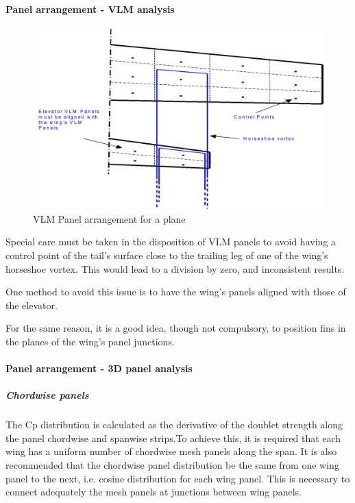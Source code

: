 \documentclass[a4paper,twoside,12pt,dvips]{article}
\begin{document}
\paragraph{Panel arrangement - VLM analysis}

\begin{figure}[htbp]
  \includegraphics[width=0.8\linewidth]{img-12}\centering 
  \caption{VLM Panel arrangement for a plane}
  \label{fig:vlm_panel_arrangement_for_a_plane}
\end{figure}

Special care must be taken in the disposition of VLM panels to avoid
having a control point of the tail's surface close to the trailing leg
of one of the wing's horseshoe vortex.  This would lead to a division
by zero, and inconsistent results.

One method to avoid this issue is to have the wing's panels aligned
with those of the elevator.

For the same reason, it is a good idea, though not compulsory, to
position fins in the planes of the wing's panel junctions.

\paragraph{Panel arrangement - 3D panel analysis}

\subparagraph{Chordwise panels}

The Cp distribution is calculated as the derivative of the doublet
strength along the panel chordwise and spanwise strips.To achieve this,
it is required that each wing has a uniform number of chordwise mesh
panels along the span. It is also recommended that the chordwise panel
distribution be the same from one wing panel to the next, i.e. cosine
distribution for each wing panel. This is necessary to connect
adequately the mesh panels at junctions between wing panels.
\end{document}
